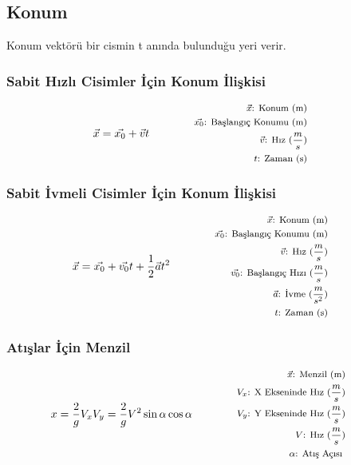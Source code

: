 \subsection{Konum}

Konum vektörü bir cismin t anında bulunduğu yeri verir.

\subsubsection*{Sabit Hızlı Cisimler İçin Konum İlişkisi}
\begin{equation}
    \vec{x} = \vec{x_0} + \vec{v}t \qquad \qquad \parbox{4cm}{\footnotesize$\begin{aligned}
        \vec{x}\text{: Konum (m)} \\
        \vec{x_0}\text{: Başlangıç Konumu (m)} \\
        \vec{v}\text{: Hız } (\frac{m}{s}) \\
        t\text{: Zaman (s)}
\end{aligned}$}
\end{equation}

\subsubsection*{Sabit İvmeli Cisimler İçin Konum İlişkisi}
\begin{equation}
    \vec{x} = \vec{x_0} + \vec{v_0}t + \frac{1}{2} \vec{a} t^2 \qquad \qquad \parbox{4cm}{\footnotesize$\begin{aligned}
        \vec{x}\text{: Konum (m)} \\
        \vec{x_0}\text{: Başlangıç Konumu (m)} \\
        \vec{v}\text{: Hız } (\frac{m}{s}) \\
        \vec{v_0}\text{: Başlangıç Hızı } (\frac{m}{s}) \\
        \vec{a}\text{: İvme } (\frac{m}{s^2}) \\
        t\text{: Zaman (s)} 
\end{aligned}$}
\end{equation}

\subsubsection*{Atışlar İçin Menzil}
\begin{equation}
    x = \frac{2}{g}V_x V_y = \frac{2}{g}V^2\sin{\alpha}\cos{\alpha} \qquad \qquad \parbox{4cm}{\footnotesize$\begin{aligned}
        \vec{x}\text{: Menzil (m)} \\
        V_x\text{: X Ekseninde Hız } (\frac{m}{s}) \\
        V_y\text{: Y Ekseninde Hız } (\frac{m}{s}) \\
        V\text{: Hız } (\frac{m}{s}) \\
        \alpha\text{: Atış Açısı }
\end{aligned}$}
\end{equation}